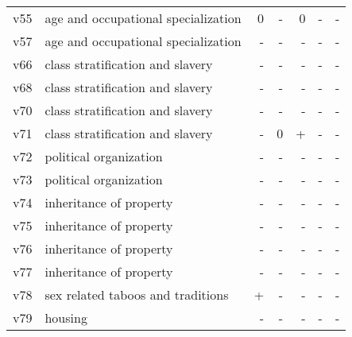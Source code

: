 \documentclass[12pt, a4paper]{article}
\begin{document}
\begin{table}
{\begin{tabular}{llrrrrr}
    v55 & age and occupational specialization & 0 & \cellcolor{myred} - & 0 & \cellcolor{myred} - & \cellcolor{myred} -\\
    v57 & age and occupational specialization & \cellcolor{myred} - & \cellcolor{myred} - & \cellcolor{myred} - & \cellcolor{myred} - & \cellcolor{myred} -\\
    v66 & class stratification and slavery & \cellcolor{myred} - & \cellcolor{myred} - & \cellcolor{myred} - & \cellcolor{myred} - & \cellcolor{myred} -\\
    v68 & class stratification and slavery & \cellcolor{myred} - & \cellcolor{myred} - & \cellcolor{myred} - & \cellcolor{myred} - & \cellcolor{myred} -\\
    v70 & class stratification and slavery & \cellcolor{myred} - & \cellcolor{myred} - & \cellcolor{myred} - & \cellcolor{myred} - & \cellcolor{myred} -\\
    v71 & class stratification and slavery & \cellcolor{myred} - & 0 & \cellcolor{myblue} + & \cellcolor{myred} - & \cellcolor{myred} -\\
    v72 & political organization & \cellcolor{myred} - & \cellcolor{myred} - & \cellcolor{myred} - & \cellcolor{myred} - & \cellcolor{myred} -\\
    v73 & political organization & \cellcolor{myred} - & \cellcolor{myred} - & \cellcolor{myred} - & \cellcolor{myred} - & \cellcolor{myred} -\\
    v74 & inheritance of property & \cellcolor{myred} - & \cellcolor{myred} - & \cellcolor{myred} - & \cellcolor{myred} - & \cellcolor{myred} -\\
    v75 & inheritance of property & \cellcolor{myred} - & \cellcolor{myred} - & \cellcolor{myred} - & \cellcolor{myred} - & \cellcolor{myred} -\\
    v76 & inheritance of property & \cellcolor{myred} - & \cellcolor{myred} - & \cellcolor{myred} - & \cellcolor{myred} - & \cellcolor{myred} -\\
    v77 & inheritance of property & \cellcolor{myred} - & \cellcolor{myred} - & \cellcolor{myred} - & \cellcolor{myred} - & \cellcolor{myred} -\\
    v78 & sex related taboos and traditions & \cellcolor{myblue} + & \cellcolor{myred} - & \cellcolor{myred} - & \cellcolor{myred} - & \cellcolor{myred} -\\
    v79 & housing & \cellcolor{myred} - & \cellcolor{myred} - & \cellcolor{myred} - & \cellcolor{myred} - & \cellcolor{myred} -\\

\end{tabular}}
\end{table}
\end{document}
